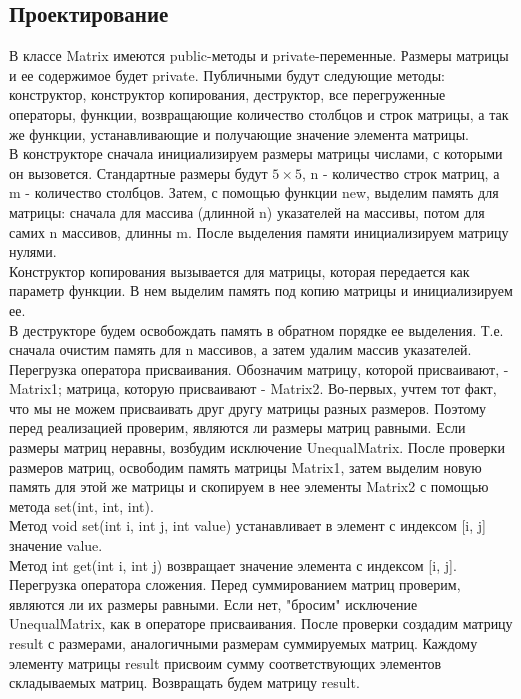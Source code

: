\documentclass[12pt,a4paper]{report}
\begin{document}
\subsection{Проектирование}
В классе Matrix имеются public-методы и private-переменные. Размеры матрицы и ее содержимое будет private. Публичными будут следующие методы: конструктор, конструктор копирования, деструктор, все перегруженные операторы, функции, возвращающие количество столбцов и строк матрицы, а так же функции, устанавливающие и получающие значение элемента матрицы. \\
В конструкторе сначала инициализируем размеры матрицы числами, с которыми он вызовется. Стандартные размеры будут $5\times5$, n - количество строк матриц, а m - количество столбцов. Затем, с помощью функции new, выделим память для матрицы: сначала для массива (длинной n) указателей на массивы, потом для самих n массивов, длинны m. После выделения памяти инициализируем матрицу нулями. \\
Конструктор копирования вызывается для матрицы, которая передается как параметр функции. В нем выделим память под копию матрицы и инициализируем ее. \\
В деструкторе будем освобождать память в обратном порядке ее выделения. Т.е. сначала очистим память для n массивов, а затем удалим массив указателей. \\
Перегрузка оператора присваивания. Обозначим матрицу, которой присваивают, - Matrix1; матрица, которую присваивают - Matrix2. Во-первых, учтем тот факт, что мы не можем присваивать друг другу матрицы разных размеров. Поэтому перед реализацией проверим, являются ли размеры матриц равными. Если размеры матриц неравны, возбудим исключение UnequalMatrix. После проверки размеров матриц, освободим память матрицы Matrix1, затем выделим новую память для этой же матрицы и скопируем в нее элементы Matrix2 с помощью метода set(int, int, int).\\
Метод void set(int i, int j, int value) устанавливает в элемент с индексом [i, j] значение value. \\
Метод int get(int i, int j) возвращает значение элемента с индексом [i, j]. \\
Перегрузка оператора сложения. Перед суммированием матриц проверим, являются ли их размеры равными. Если нет, "бросим" исключение UnequalMatrix, как в операторе присваивания. После проверки создадим матрицу result с размерами, аналогичными размерам суммируемых матриц. Каждому элементу матрицы result присвоим сумму соответствующих элементов складываемых матриц. Возвращать будем матрицу result. \\
\end{document}
